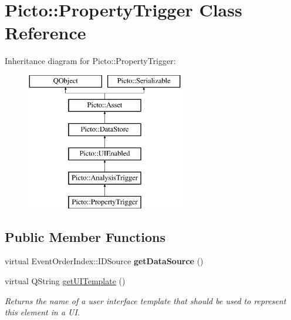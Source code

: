 \hypertarget{class_picto_1_1_property_trigger}{\section{Picto\-:\-:Property\-Trigger Class Reference}
\label{class_picto_1_1_property_trigger}
}
Inheritance diagram for Picto\-:\-:Property\-Trigger\-:\begin{figure}[H]
\begin{center}
\leavevmode
\includegraphics[height=6.000000cm]{class_picto_1_1_property_trigger}
\end{center}
\end{figure}
\subsection*{Public Member Functions}
\begin{DoxyCompactItemize}
\item 
\hypertarget{class_picto_1_1_property_trigger_a75d48bc60298a7a053c9696489805091}{virtual Event\-Order\-Index\-::\-I\-D\-Source {\bfseries get\-Data\-Source} ()}\label{class_picto_1_1_property_trigger_a75d48bc60298a7a053c9696489805091}

\item 
\hypertarget{class_picto_1_1_property_trigger_a1ddf9db45fdc7b6a282e49165700f4cc}{virtual Q\-String \hyperlink{class_picto_1_1_property_trigger_a1ddf9db45fdc7b6a282e49165700f4cc}{get\-U\-I\-Template} ()}\label{class_picto_1_1_property_trigger_a1ddf9db45fdc7b6a282e49165700f4cc}

\begin{DoxyCompactList}\small\item\em Returns the name of a user interface template that should be used to represent this element in a U\-I. \end{DoxyCompactList}\end{DoxyCompactItemize}
